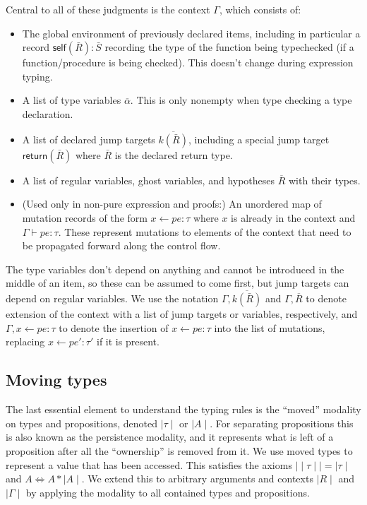 \documentclass[acmsmall,nonacm]{acmart}
\newcommand{\core}[1]{{\mid}#1{\mid}}
\newcommand{\proves}{\vdash}
\begin{document}
Central to all of these judgments is the context $\Gamma$, which consists of:
\begin{itemize}
  \item The global environment of previously declared items, including in particular a record $\mathsf{self}(\bar R):\bar S$ recording the type of the function being typechecked (if a function/procedure is being checked). This doesn't change during expression typing.
  \item A list of type variables $\overline{\alpha}$. This is only nonempty when type checking a type declaration.
  \item A list of declared jump targets $\overline{k(\bar{R})}$, including a special jump target $\mathsf{return}(\bar{R})$ where $\bar{R}$ is the declared return type.
  \item A list of regular variables, ghost variables, and hypotheses $\overline{R}$ with their types.
  \item (Used only in non-pure expression and proofs:) An unordered map of mutation records of the form $x\gets pe:\tau$ where $x$ is already in the context and $\Gamma\proves pe:\tau$. These represent mutations to elements of the context that need to be propagated forward along the control flow.
\end{itemize}
The type variables don't depend on anything and cannot be introduced in the middle of an item, so these can be assumed to come first, but jump targets can depend on regular variables. We use the notation $\Gamma,\overline{k(\bar{R})}$ and $\Gamma,\overline{R}$ to denote extension of the context with a list of jump targets or variables, respectively, and $\Gamma,x\gets pe:\tau$ to denote the insertion of $x\gets pe:\tau$ into the list of mutations, replacing $x\gets pe':\tau'$ if it is present.

\subsection{Moving types}\label{sec:moving}

The last essential element to understand the typing rules is the ``moved'' modality on types and propositions, denoted $\core\tau$ or $\core A$. For separating propositions this is also known as the persistence modality, and it represents what is left of a proposition after all the ``ownership'' is removed from it. We use moved types to represent a value that has been accessed. This satisfies the axioms $\core{\core\tau}=\core\tau$ and $A\Leftrightarrow A\ast\core A$. We extend this to arbitrary arguments and contexts $\core R$ and $\core\Gamma$ by applying the modality to all contained types and propositions.
\end{document}
